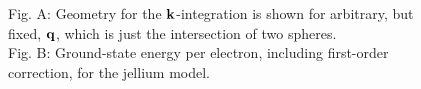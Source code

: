 \begin{figure}
    \centering
    \qquad
    \caption{Fig. A: Geometry for the ${\bf k}$-integration is shown for arbitrary, but fixed, ${\bf q}$, which is just the intersection of two spheres. \\
    Fig. B: Ground-state energy per electron, including first-order correction, for the jellium model.}
    \label{figs:jellium}
\end{figure}

